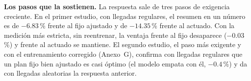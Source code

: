 \noindent\textbf{Los pasos que la sostienen.} La respuesta sale de tres
pasos de exigencia creciente. En el primer estudio, con llegadas
regulares, el resumen en un número es de $-6.83$\,\% frente al fijo
ajustado y de $-14.35$\,\% frente al actuado. Con la medición más
estricta, sin reentrenar, la ventaja frente al fijo desaparece
($-0.03$\,\%) y frente al actuado se mantiene. El segundo estudio, el
paso más exigente y con el entrenamiento corregido (Anexo~G), confirma
con llegadas regulares que un plan fijo bien ajustado es casi óptimo (el
modelo empata con él, $-0.4$\,\%) y da con llegadas aleatorias la
respuesta anterior.

